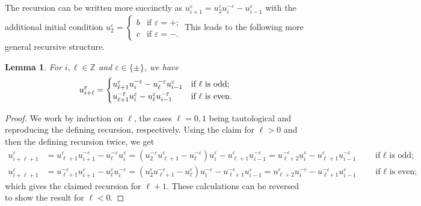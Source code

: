 \documentclass{amsart}
\newtheorem{lemma}[theorem]{Lemma}
\numberwithin{theorem}{section}
\newcommand{\ZZ}{\mathbb{Z}}
\begin{document}
  The recursion can be written more succinctly as $u_{i+1}^\varepsilon=u_2^\varepsilon u_i^{-\varepsilon}-u_{i-1}^\varepsilon$ with the additional initial condition $u_2^\varepsilon=\begin{cases} b & \text{if $\varepsilon=+$;}\\ c & \text{if $\varepsilon=-$.} \end{cases}$
  This leads to the following more general recursive structure.
  \begin{lemma}
    For $i,\ell\in\ZZ$ and $\varepsilon\in\{\pm\}$, we have
    \begin{equation}
      \label{eq:long Chebyshev recursion}
      u_{i+\ell}^\varepsilon=\begin{cases} u_{\ell+1}^\varepsilon u_i^{-\varepsilon}-u_\ell^{-\varepsilon} u_{i-1}^\varepsilon & \text{\upshape if $\ell$ is odd;}\\ u_{\ell+1}^{-\varepsilon} u_i^\varepsilon-u_\ell^\varepsilon u_{i-1}^{-\varepsilon} & \text{\upshape if $\ell$ is even.} \end{cases}
    \end{equation}
  \end{lemma}
  \begin{proof}
    We work by induction on $\ell$, the cases $\ell=0,1$ being tautological and reproducing the defining recursion, respectively.
    Using the claim for $\ell>0$ and then the defining recursion twice, we get
    \begin{align*}
      u_{i+\ell+1}^\varepsilon
      &=
      u_{\ell+1}^\varepsilon u_{i+1}^{-\varepsilon}-u_\ell^{-\varepsilon} u_i^\varepsilon
      =(u_2^{-\varepsilon} u_{\ell+1}^\varepsilon-u_\ell^{-\varepsilon}) u_i^\varepsilon-u_{\ell+1}^\varepsilon u_{i-1}^{-\varepsilon}
      =u_{\ell+2}^{-\varepsilon} u_i^\varepsilon - u_{\ell+1}^\varepsilon u_{i-1}^{-\varepsilon}
      \qquad \text{if $\ell$ is odd;}\\ 
      u_{i+\ell+1}^\varepsilon
      &=
      u_{\ell+1}^{-\varepsilon} u_{i+1}^\varepsilon-u_\ell^\varepsilon u_i^{-\varepsilon}
      =(u_2^\varepsilon u_{\ell+1}^{-\varepsilon}-u_\ell^\varepsilon) u_i^{-\varepsilon}-u_{\ell+1}^{-\varepsilon} u_{i-1}^\varepsilon
      =u_{\ell+2}^\varepsilon u_i^{-\varepsilon}-u_{\ell+1}^{-\varepsilon} u_{i-1}^\varepsilon
      \qquad \text{if $\ell$ is even;} 
    \end{align*}
    which gives the claimed recursion for $\ell+1$.
    These calculations can be reversed to show the result for $\ell<0$.
  \end{proof}
\end{document}
